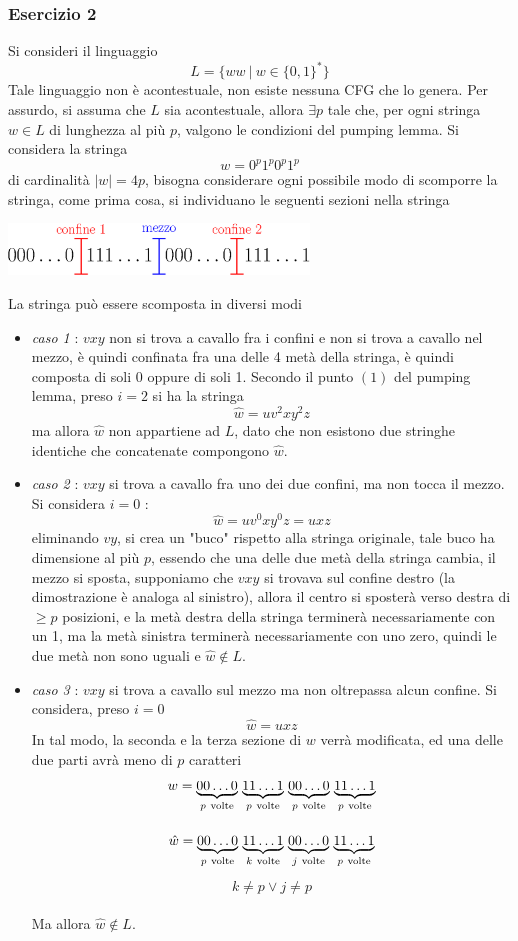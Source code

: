 \documentclass[10pt, letterpaper]{report}
\begin{document}
\subsubsection{Esercizio 2}\label{es2}
Si consideri il linguaggio 
$$ L=\{ww \ | \  w\in\{0,1\}^* \}$$
Tale linguaggio non è acontestuale, non esiste nessuna CFG che lo genera. Per assurdo, si assuma che $L$ sia 
acontestuale, allora $\exists p$ tale che, per ogni stringa $w\in L$ di lunghezza al più 
$p$, valgono le condizioni del pumping lemma. \acc Si considera la stringa $$ w=0^p1^p0^p1^p$$ di cardinalità $|w|=4p$, 
bisogna considerare ogni possibile modo di scomporre la stringa, come prima cosa, si individuano le seguenti sezioni 
nella stringa\begin{center}
    \includegraphics[width=0.6\textwidth ]{images/sezioniStringa4p.eps}
\end{center}
La stringa può essere scomposta in diversi modi\begin{itemize}
    \item \textit{caso 1} : $vxy$ non si trova a cavallo fra i confini e non si trova a cavallo nel mezzo, è 
    quindi confinata fra una delle 4 metà della stringa, è quindi composta di soli 0 oppure di soli 1. Secondo il punto 
 $(1)$ del pumping lemma, preso $i=2$ si ha la stringa $$ \hat w = uv^2xy^2z$$
ma allora $\hat w$ non appartiene ad $L$, dato che non esistono due stringhe identiche che concatenate compongono $\hat w$. 
\item \textit{caso 2} : $vxy$ si trova a cavallo fra uno dei due confini, ma non tocca il mezzo. Si considera $i=0$ : 
$$ \hat w = uv^0xy^0z=uxz$$
eliminando $vy$, si crea un "buco" rispetto alla stringa originale, tale buco ha dimensione 
al più $p$, essendo che una delle due metà della stringa cambia, il mezzo si sposta, supponiamo che $vxy$ si trovava sul confine 
destro (la dimostrazione è analoga al sinistro), allora il centro si sposterà verso destra di $\ge p$ posizioni, e la metà destra della 
stringa terminerà necessariamente con un 1, ma la metà sinistra terminerà necessariamente con uno zero, quindi le due metà 
non sono uguali e $\hat w\notin L$. 
\item \textit{caso 3} : $vxy$ si trova a cavallo sul mezzo ma non oltrepassa alcun confine. Si considera, preso $i=0$
$$ \hat w = uxz$$ 
In tal modo, la seconda e la terza sezione di $w$ verrà modificata, ed una delle due parti avrà meno di $p$ caratteri 
$$  w = \smash{\underbrace{00\dots 0}_{p\ \text{volte}}} \
\smash{\underbrace{11\dots 1}_{p\ \text{volte}}} \
\smash{\underbrace{00\dots 0}_{p\ \text{volte}}} \
\smash{\underbrace{11\dots 1}_{p\ \text{volte}}} $$ 
\\
$$ \hat w = \smash{\underbrace{00\dots 0}_{p\ \text{volte}}} \
\smash{\underbrace{11\dots 1}_{k\ \text{volte}}} \
\smash{\underbrace{00\dots 0}_{j\ \text{volte}}} \
\smash{\underbrace{11\dots 1}_{p\ \text{volte}}} $$\\ $$k\ne p\lor j\ne p $$
\\Ma allora $\hat w \notin L$.
\end{itemize}
\end{document}
